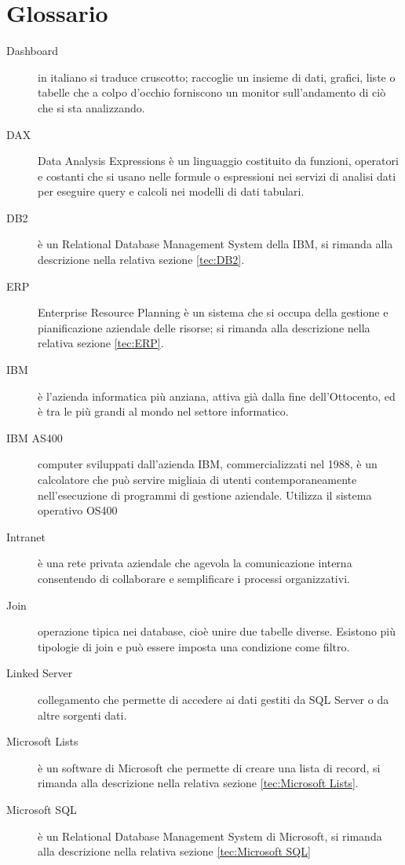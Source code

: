 \chapter{Glossario}
\begin{description}
    \item[Dashboard] in italiano si traduce cruscotto; raccoglie un insieme di dati, grafici, liste o tabelle che a colpo d'occhio forniscono un monitor sull'andamento di ciò che si sta analizzando.
    \item[DAX] Data Analysis Expressions è un linguaggio costituito da funzioni, operatori e costanti che si usano nelle formule o espressioni nei servizi di analisi dati per eseguire query e calcoli nei modelli di dati tabulari.
    \item[DB2] è un Relational Database Management System della IBM, si rimanda alla descrizione nella relativa sezione \ref*{tec:DB2}.
    \item[ERP] Enterprise Resource Planning è un sistema che si occupa della gestione e pianificazione aziendale delle risorse; si rimanda alla descrizione nella relativa sezione \ref*{tec:ERP}.
    \item[IBM] è l'azienda informatica più anziana, attiva già dalla fine dell'Ottocento, ed è tra le più grandi al mondo nel settore informatico.
    \item[IBM AS400] computer sviluppati dall'azienda IBM, commercializzati nel 1988, è un calcolatore che può servire migliaia di utenti contemporaneamente nell'esecuzione di programmi di gestione aziendale. Utilizza il sistema operativo OS400
    \item[Intranet]  è una rete privata aziendale che agevola la comunicazione interna consentendo di collaborare e semplificare i processi organizzativi.
    \item[Join] operazione tipica nei database, cioè unire due tabelle diverse. Esistono più tipologie di join e può essere imposta una condizione come filtro.
    \item[Linked Server] collegamento che permette di accedere ai dati gestiti da SQL Server o da altre sorgenti dati.
    \item[Microsoft Lists] è un software di Microsoft che permette di creare una lista di record, si rimanda alla descrizione nella relativa sezione \ref*{tec:Microsoft Lists}.
    \item[Microsoft SQL] è un Relational Database Management System di Microsoft, si rimanda alla descrizione nella relativa sezione \ref*{tec:Microsoft SQL}

\end{description}
